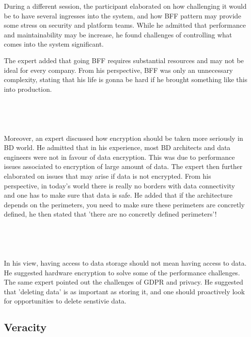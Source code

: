 \documentclass{bmcart}
\begin{document}
During a different session, the participant elaborated on how challenging it would be to have several ingresses into the system, and how BFF pattern may provide some stress on security and platform teams. While he admitted that performance and maintainability may be increase, he found challenges of controlling what comes into the system significant. 

The expert added that going BFF requires substantial resources and may not be ideal for every company. From his perspective, BFF was only an unnecessary complexity, stating that his life is gonna be hard if he brought something like this into production.

\,

\setlength{\fboxsep}{0.7em}
\noindent{}

\,

Moreover, an expert discussed how encryption should be taken more seriously in BD world. He admitted that in his experience, most BD architects and data engineers were not in favour of data encryption. This was due to performance issues associated to encryption of large amount of data. The expert then further elaborated on issues that may arise if data is not encrypted. From his perspective, in today's world there is really no borders with data connectivity and one has to make sure that data is safe. He added that if the architecture depends on the perimeters, you need to make sure these perimeters are concretly defined, he then stated that 'there are no concretly defined perimeters'! 

\,

\setlength{\fboxsep}{0.7em}
\noindent{}

\,

In his view, having access to data storage should not mean having access to data. He suggested hardware encryption to solve some of the performance challenges. The same expert pointed out the challenges of GDPR and privacy. He suggested that 'deleting data' is as important as storing it, and one should proactively look for opportunities to delete senstivie data. 


\subsection{Veracity}
\end{document}
